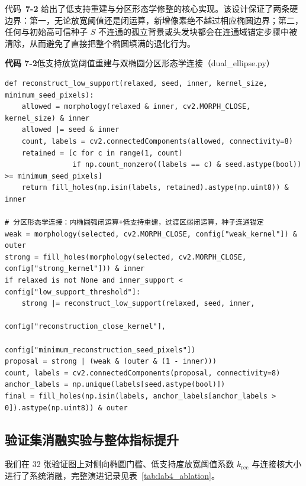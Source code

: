 代码~\textbf{7-2} 给出了低支持重建与分区形态学修整的核心实现。该设计保证了两条硬边界：第一，无论放宽阈值还是闭运算，新增像素绝不越过相应椭圆边界；第二，任何与初始高可信种子 $S$ 不连通的孤立背景或头发块都会在连通域锚定步骤中被清除，从而避免了直接把整个椭圆填满的退化行为。

\noindent\textbf{代码 7-2}\quad 低支持放宽阈值重建与双椭圆分区形态学连接（dual\_ellipse.py）
\begin{lstlisting}
def reconstruct_low_support(relaxed, seed, inner, kernel_size, minimum_seed_pixels):
    allowed = morphology(relaxed & inner, cv2.MORPH_CLOSE, kernel_size) & inner
    allowed |= seed & inner
    count, labels = cv2.connectedComponents(allowed, connectivity=8)
    retained = [c for c in range(1, count)
                if np.count_nonzero((labels == c) & seed.astype(bool)) >= minimum_seed_pixels]
    return fill_holes(np.isin(labels, retained).astype(np.uint8)) & inner

# 分区形态学连接：内椭圆强闭运算+低支持重建，过渡区弱闭运算，种子连通锚定
weak = morphology(selected, cv2.MORPH_CLOSE, config["weak_kernel"]) & outer
strong = fill_holes(morphology(selected, cv2.MORPH_CLOSE, config["strong_kernel"])) & inner
if relaxed is not None and inner_support < config["low_support_threshold"]:
    strong |= reconstruct_low_support(relaxed, seed, inner,
                                      config["reconstruction_close_kernel"],
                                      config["minimum_reconstruction_seed_pixels"])
proposal = strong | (weak & (outer & (1 - inner)))
count, labels = cv2.connectedComponents(proposal, connectivity=8)
anchor_labels = np.unique(labels[seed.astype(bool)])
final = fill_holes(np.isin(labels, anchor_labels[anchor_labels > 0]).astype(np.uint8)) & outer
\end{lstlisting}

\subsection{验证集消融实验与整体指标提升}

我们在 32 张验证图上对侧向椭圆门槛、低支持度放宽阈值系数 $k_{\text{rec}}$ 与连接核大小进行了系统消融，完整演进记录见表~\ref{tab:lab4_ablation}。

